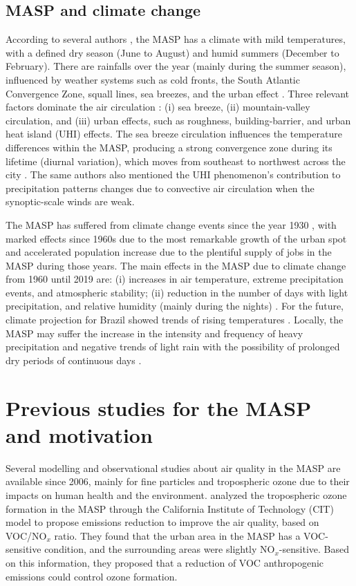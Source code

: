 \subsection{MASP and climate change}
According to several authors \citep{Andrade2017, Lima2018}, the MASP has a climate with mild temperatures, with a defined dry season (June to August) and humid summers (December to February).
There are rainfalls over the year (mainly during the summer season), influenced by weather systems such as cold fronts, the South Atlantic Convergence Zone, squall lines, sea breezes, and the urban effect \citep{Andrade2017, Lima2018}.
Three relevant factors dominate the air circulation \citep{Oliveira2003}: (i) sea breeze, (ii) mountain-valley circulation, and (iii) urban effects, such as roughness, building-barrier, and urban heat island (UHI) effects.
The sea breeze circulation influences the temperature differences within the MASP, producing a strong convergence zone during its lifetime (diurnal variation), which moves from southeast to northwest across the city \citep{Lima2018}.
The same authors also mentioned the UHI phenomenon's contribution to precipitation patterns changes due to convective air circulation when the synoptic-scale winds are weak.

The MASP has suffered from climate change events since the year 1930 \citep{Marengo2020}, with marked effects since 1960s \citep{Lima2018} due to the most remarkable growth of the urban spot and accelerated population increase due to the plentiful supply of jobs in the MASP during those years.
The main effects in the MASP due to climate change from 1960 until 2019 are: (i) increases in air temperature, extreme precipitation events, and atmospheric stability; (ii) reduction in the number of days with light precipitation, and relative humidity (mainly during the nights) \citep{Marengo2013, Lima2018, Nobre2019, Marengo2020}.
For the future, climate projection for Brazil showed trends of rising temperatures \citep{Nobre2019}.
Locally, the MASP may suffer the increase in the intensity and frequency of heavy precipitation and negative trends of light rain with the possibility of prolonged dry periods of continuous days \citep{Marengo2013}. 

\section{Previous studies for the MASP and motivation}\label{sec: prev studies}
Several modelling and observational studies about air quality in the MASP are available since 2006, mainly for fine particles and tropospheric ozone due to their impacts on human health and the environment.
\citet*{Sanchez-Ccoyllo2006} analyzed the tropospheric ozone formation in the MASP through the California Institute of Technology (CIT) model to propose emissions reduction to improve the air quality, based on VOC/NO$_x$ ratio.
They found that the urban area in the MASP has a VOC-sensitive condition, and the surrounding areas were slightly NO$_x$-sensitive.
Based on this information, they proposed that a reduction of VOC anthropogenic emissions could control ozone formation.

